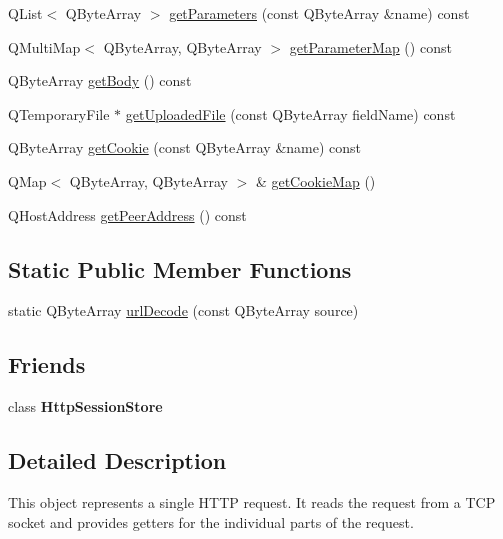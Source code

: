 \begin{DoxyCompactItemize}
Q\+List$<$ Q\+Byte\+Array $>$ \mbox{\hyperlink{classstefanfrings_1_1_http_request_a0711a770d0547a75f5cfb68c9ac1a760}{get\+Parameters}} (const Q\+Byte\+Array \&name) const
\item 
Q\+Multi\+Map$<$ Q\+Byte\+Array, Q\+Byte\+Array $>$ \mbox{\hyperlink{classstefanfrings_1_1_http_request_a25c8d4b0ff23dc67bbbbb2b03bba3a5b}{get\+Parameter\+Map}} () const
\item 
Q\+Byte\+Array \mbox{\hyperlink{classstefanfrings_1_1_http_request_abbeb8becf2709b15be3096bcd3b85181}{get\+Body}} () const
\item 
Q\+Temporary\+File $\ast$ \mbox{\hyperlink{classstefanfrings_1_1_http_request_ac85c0bf7867adf6145902c51d4bc4701}{get\+Uploaded\+File}} (const Q\+Byte\+Array field\+Name) const
\item 
Q\+Byte\+Array \mbox{\hyperlink{classstefanfrings_1_1_http_request_a8df857484bbe4cc8362ddd49a604f649}{get\+Cookie}} (const Q\+Byte\+Array \&name) const
\item 
Q\+Map$<$ Q\+Byte\+Array, Q\+Byte\+Array $>$ \& \mbox{\hyperlink{classstefanfrings_1_1_http_request_a408b9110494fbeb1d5e1140bc2a49112}{get\+Cookie\+Map}} ()
\item 
Q\+Host\+Address \mbox{\hyperlink{classstefanfrings_1_1_http_request_ae7cd8408c9b67f1632784468ace2d560}{get\+Peer\+Address}} () const
\end{DoxyCompactItemize}
\subsection*{Static Public Member Functions}
\begin{DoxyCompactItemize}
\item 
static Q\+Byte\+Array \mbox{\hyperlink{classstefanfrings_1_1_http_request_a83651afcea6094403fb7cdb2d947cd0c}{url\+Decode}} (const Q\+Byte\+Array source)
\end{DoxyCompactItemize}
\subsection*{Friends}
\begin{DoxyCompactItemize}
\item 
\mbox{\label{classstefanfrings_1_1_http_request_a1a26a85c96397fab7acf42d9c3fc61df}} 
class {\bfseries Http\+Session\+Store}
\end{DoxyCompactItemize}


\subsection{Detailed Description}
This object represents a single H\+T\+TP request. It reads the request from a T\+CP socket and provides getters for the individual parts of the request. 

